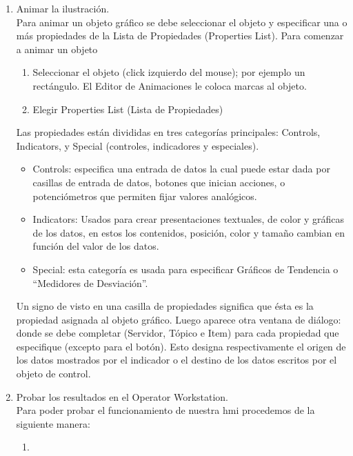 \begin{enumerate}
 \item Animar la ilustración.\\
      Para animar un objeto gráfico se debe seleccionar el objeto y especificar una o
      más propiedades de la Lista de Propiedades (Properties List).
      Para comenzar a animar un objeto
      \begin{enumerate}
	\item Seleccionar el objeto (click izquierdo del mouse); por ejemplo un rectángulo. El
	Editor de Animaciones le coloca marcas al objeto.
	\item Elegir Properties List (Lista de Propiedades) 
      \end{enumerate}
      Las propiedades están divididas en tres
      categorías principales: Controls, Indicators, y Special 
      (controles, indicadores y especiales).
      \begin{itemize}
	\item  Controls: especifica una entrada de datos la cual puede estar dada por 
	casillas de entrada de datos, botones que inician acciones, o
	potenciómetros que permiten fijar valores analógicos.
	\item Indicators: Usados para crear presentaciones textuales, de color
	y gráficas de los datos, en estos los contenidos, posición, color y
	tamaño cambian en función del valor de los datos.
	\item Special: esta categoría es usada para especificar Gráficos de Tendencia o
	“Medidores de Desviación”.
      \end{itemize}
      Un signo de visto en una casilla de propiedades significa que ésta es la propiedad
      asignada al objeto gráfico. Luego aparece otra ventana de diálogo:
      donde se debe completar (Servidor, Tópico e Item) para cada
      propiedad que especifique (excepto para el botón). Esto designa
      respectivamente el origen de los datos mostrados por el indicador o 
      el destino de los datos escritos por el objeto de control.
      
 \item Probar los resultados en el Operator Workstation.\\
      Para poder probar el funcionamiento de nuestra \gls{hmi} procedemos de la siguiente manera:
      \begin{enumerate}
       \item 
      \end{enumerate}

\end{enumerate}












